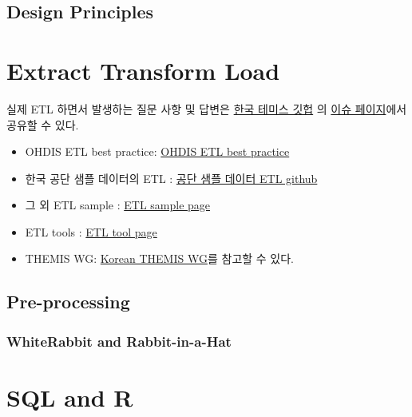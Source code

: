 \documentclass[]{book}
\providecommand{\tightlist}{%
  \setlength{\itemsep}{0pt}\setlength{\parskip}{0pt}}
\begin{document}
\hypertarget{design-principles}{%
\section{Design Principles}\label{design-principles}}

\hypertarget{etl}{%
\chapter{Extract Transform Load}\label{etl}}

실제 ETL 하면서 발생하는 질문 사항 및 답변은 \href{https://github.com/ohdsi-korea/themiskorea}{한국 테미스 깃헙} 의 \href{https://github.com/ohdsi-korea/themiskorea/issues}{이슈 페이지}에서 공유할 수 있다.

\begin{itemize}
\tightlist
\item
  OHDIS ETL best practice: \href{https://www.ohdsi.org/web/wiki/doku.php?id=documentation:etl_best_practices}{OHDIS ETL best practice}
\item
  한국 공단 샘플 데이터의 ETL : \href{https://github.com/OHDSI/ETL---Korean-NSC}{공단 샘플 데이터 ETL github}
\item
  그 외 ETL sample : \href{https://www.ohdsi.org/web/wiki/doku.php?id=documentation:example_etls}{ETL sample page}
\item
  ETL tools : \href{https://www.ohdsi.org/web/wiki/doku.php?id=documentation:software:whiterabbit}{ETL tool page}
\item
  THEMIS WG: \href{https://github.com/ohdsi/themis}{Korean THEMIS WG}를 참고할 수 있다.
\end{itemize}

\hypertarget{pre-processing}{%
\section{Pre-processing}\label{pre-processing}}

\hypertarget{whiterabbit-and-rabbit-in-a-hat}{%
\subsection{WhiteRabbit and Rabbit-in-a-Hat}\label{whiterabbit-and-rabbit-in-a-hat}}

\hypertarget{sql-and-r}{%
\chapter{SQL and R}\label{sql-and-r}}
\end{document}
